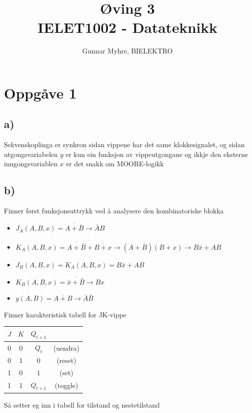 \documentclass[12pt,a4paper]{article}
\title{%
  Øving 3 \\
  \large IELET1002 - Datateknikk \\
  }
\author{Gunnar Myhre, BIELEKTRO}
\newcommand{\N}{\overline}
\begin{document}
  \maketitle
  
  \section{Oppgåve 1}
    \subsection{a)}
      Sekvenskoplinga er synkron sidan vippene har det same klokkesignalet, og
      sidan utgongsvariabelen $y$ er kun ein funksjon av vippeutgongane og
      ikkje den eksterne inngongsvariablen $x$ er det snakk om MOORE-logikk
    \subsection{b)}
      Finner først funksjonsuttrykk ved å analysere den kombinatoriske blokka
      \begin{itemize}
        \item $J_A(A,B,x) = \N{A+\bar{B}} \rightarrow \bar{A}B$
        \item $K_A(A,B,x) = \N{ \N{A+\bar{B}} + \N{B+x}} \rightarrow (A+\bar{B})(B+x)
          \rightarrow B\bar{x} + AB$
        \item $J_B(A,B,x) = K_A(A,B,x) = B\bar{x} + AB$
        \item $K_B(A,B,x) = \N{\bar{x} + \bar{B}} \rightarrow Bx$
        \item $y(A,B) = \N{A + B} \rightarrow \bar{A}\bar{B}$
      \end{itemize}
      Finner karakteristisk tabell for JK-vippe
      \begin{center}
        \begin{tabular}{ |c|c|c c| }
          \hline
          $J$ & $K$ & $Q_{t+1}$ & \\
          \hline
          0 & 0 & $Q_t$ & (uendra) \\
          \hline
          0 & 1 & $0$ & (reset) \\
          \hline
          1 & 0 & $1$ & (set) \\
          \hline
          1 & 1 & $Q_{t+1}$ & (toggle) \\
          \hline
        \end{tabular}
      \end{center}
      Så setter eg inn i tabell for tilstand og nestetilstand
\end{document}
